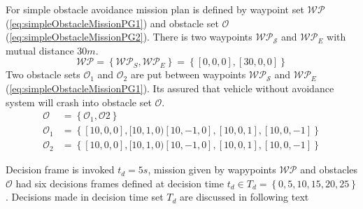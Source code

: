 For simple obstacle avoidance mission plan is defined by waypoint set $\mathscr{WP}$ (\ref{eq:simpleObstacleMissionPG1}) and obstacle set $\mathscr{O}$ (\ref{eq:simpleObstacleMissionPG2}). There is two waypoints $\mathscr{WP_S}$ and $\mathscr{WP}_E$ with mutual distance $30m$.
\begin{equation}\label{eq:simpleObstacleMissionPG1}
    \mathscr{WP}=\left\{\mathscr{WP}_S,\mathscr{WP}_E\right\} = \left\{[0,0,0],[30,0,0]\right\}
\end{equation}
Two obstacle sets $\mathscr{O}_1$ and $\mathscr{O}_2$ are put between waypoints $\mathscr{WP_S}$ and $\mathscr{WP}_E$ (\ref{eq:simpleObstacleMissionPG1}). Its assured that vehicle without avoidance system will crash into obstacle set $\mathscr{O}$.
\begin{equation}\label{eq:simpleObstacleMissionPG2}
    \begin{aligned}
    \mathscr{O}   &= \left\{\mathscr{O}_1,\mathscr{O2}\right\}\\
    \mathscr{O}_1 &= \left\{[10,0,0],[10,1,0)[10,-1,0],[10,0,1],[10,0,-1]\right\}\\
    \mathscr{O}_2 &= \left\{[10,0,0],[10,1,0)[10,-1,0],[10,0,1],[10,0,-1]\right\}
    \end{aligned}
\end{equation}

\noindent Decision frame is invoked $t_d=5s$, mission given by wapypoints $\mathscr{WP}$ and  obstacles $\mathscr{O}$ had six decisions frames defined at decision time $t_d\in T_d = \left\{0, 5, 10, 15, 20, 25\right\}$. Decisions made in decision time set $T_d$ are discussed in following text

